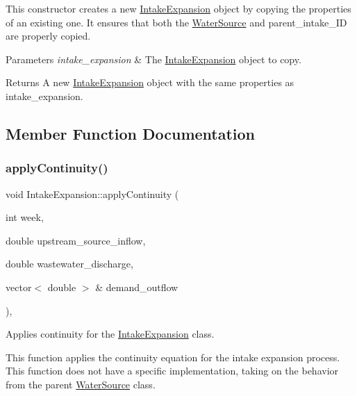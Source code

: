 This constructor creates a new {\ttfamily \mbox{\hyperlink{classIntakeExpansion}{Intake\+Expansion}}} object by copying the properties of an existing one. It ensures that both the {\ttfamily \mbox{\hyperlink{classWaterSource}{Water\+Source}}} and {\ttfamily parent\+\_\+intake\+\_\+\+ID} are properly copied.


\begin{DoxyParams}{Parameters}
{\em intake\+\_\+expansion} & The {\ttfamily \mbox{\hyperlink{classIntakeExpansion}{Intake\+Expansion}}} object to copy.\\
\hline
\end{DoxyParams}
\begin{DoxyReturn}{Returns}
A new {\ttfamily \mbox{\hyperlink{classIntakeExpansion}{Intake\+Expansion}}} object with the same properties as {\ttfamily intake\+\_\+expansion}. 
\end{DoxyReturn}


\subsection{Member Function Documentation}
\mbox{\label{classIntakeExpansion_a8686b58c65444182ba19b783fc6ff77f}} 
\subsubsection{\texorpdfstring{apply\+Continuity()}{applyContinuity()}}
{\footnotesize\ttfamily void Intake\+Expansion\+::apply\+Continuity (\begin{DoxyParamCaption}\item[{int}]{week,  }\item[{double}]{upstream\+\_\+source\+\_\+inflow,  }\item[{double}]{wastewater\+\_\+discharge,  }\item[{vector$<$ double $>$ \&}]{demand\+\_\+outflow }\end{DoxyParamCaption})\hspace{0.3cm}{\ttfamily [override]}, {\ttfamily [virtual]}}



Applies continuity for the \mbox{\hyperlink{classIntakeExpansion}{Intake\+Expansion}} class. 

This function applies the continuity equation for the intake expansion process. This function does not have a specific implementation, taking on the behavior from the parent {\ttfamily \mbox{\hyperlink{classWaterSource}{Water\+Source}}} class.


